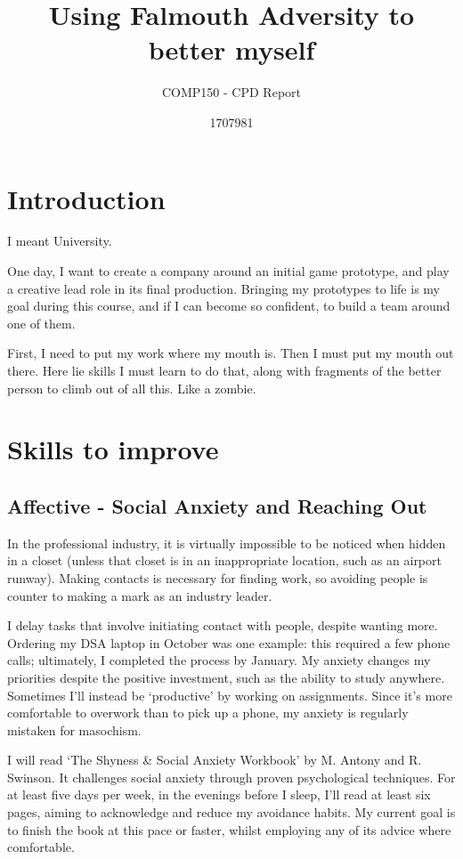 \documentclass{scrartcl}
\title{Using Falmouth Adversity to better myself}
\subtitle{COMP150 - CPD Report}
\author{1707981}
\begin{document}
\maketitle

\section{Introduction} %
I meant University.

One day, I want to create a company around an initial game prototype, and play a creative lead role in its final production. Bringing my prototypes to life is my goal during this course, and if I can become so confident, to build a team around one of them.

First, I need to put my work where my mouth is. Then I must put my mouth out there. Here lie skills I must learn to do that, along with fragments of the better person to climb out of all this. Like a zombie.

\section{Skills to improve}
\subsection{Affective - Social Anxiety and Reaching Out} %
In the professional industry, it is virtually impossible to be noticed when hidden in a closet (unless that closet is in an inappropriate location, such as an airport runway). Making contacts is necessary for finding work, so avoiding people is counter to making a mark as an industry leader.

I delay tasks that involve initiating contact with people, despite wanting more. Ordering my DSA laptop in October was one example: this required a few phone calls; ultimately, I completed the process by January. My anxiety changes my priorities despite the positive investment, such as the ability to study anywhere. Sometimes I'll instead be `productive' by working on assignments. Since it's more comfortable to overwork than to pick up a phone, my anxiety is regularly mistaken for masochism.

I will read `The Shyness \& Social Anxiety Workbook' \cite{autismsucks} by M. Antony and R. Swinson. It challenges social anxiety through proven psychological techniques. For at least five days per week, in the evenings before I sleep, I'll read at least six pages, aiming to acknowledge and reduce my avoidance habits. My current goal is to finish the book at this pace or faster, whilst employing any of its advice where comfortable.
\end{document}

